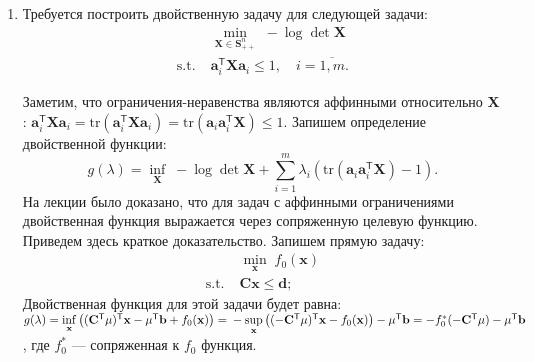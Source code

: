 \documentclass[a4paper,12pt]{article}
\renewcommand{\leq}{\leqslant}
\renewcommand{\top}{\mathsf{T}}
\newcommand{\tr}{\text{tr}}
\begin{document}
\begin{enumerate}
\item

Требуется построить двойственную задачу для следующей задачи:
\begin{equation*}
	\begin{aligned}
		& \min_{\mathbf{X}\in\mathbf{S}^n_{++}}\; -\log\det\mathbf{X}\\
		\text{s.t.}\; & \mathbf{a}_i^\top\mathbf{X}\mathbf{a}_i \leq 1,\quad i=\overline{1,m}.
	\end{aligned}
\end{equation*}

Заметим, что ограничения-неравенства являются аффинными относительно $\mathbf{X}$: $\mathbf{a}_i^\top\mathbf{X}\mathbf{a}_i = \tr(\mathbf{a}_i^\top\mathbf{X}\mathbf{a}_i) =\tr( \mathbf{a}_i\mathbf{a}_i^\top\mathbf{X}) \leq 1$. Запишем определение двойственной функции:
\begin{equation*}
	g(\lambda) = \inf\limits_{\mathbf{X}}\; -\log\det\mathbf{X} + \sum_{i=1}^m \lambda_i (\tr( \mathbf{a}_i\mathbf{a}_i^\top\mathbf{X}) - 1).
\end{equation*}
На лекции было доказано, что для задач с аффинными ограничениями двойственная функция выражается через сопряженную целевую функцию. Приведем здесь краткое доказательство. Запишем прямую задачу:
\begin{equation*}
	\begin{aligned}
		& \min_{\mathbf{x}}\; f_0(\mathbf{x})\\
		\text{s.t.}\; & \mathbf{C}\mathbf{x}\leq \mathbf{d};
	\end{aligned}
\end{equation*}
Двойственная функция для этой задачи будет равна: $g(\lambda) = \inf\limits_{\mathbf{x}}\left((\mathbf{C}^\top\mu)^\top\mathbf{x} -\mu^\top\mathbf{b}+ f_0(\mathbf{x})\right) = \\ -\sup\limits_{\mathbf{x}}\left((-\mathbf{C}^\top\mu)^\top\mathbf{x} - f_0(\mathbf{x})\right) -  \mu^\top\mathbf{b} = -f_0^*(-\mathbf{C}^\top\mu)- \mu^\top\mathbf{b}$, где $f_0^*$ --- сопряженная к $f_0$ функция.


\end{enumerate}
\end{document}
